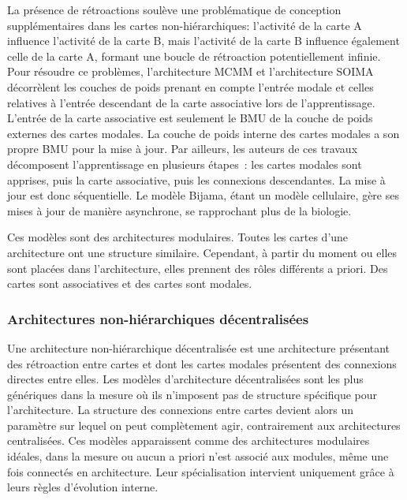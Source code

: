 \documentclass[../main]{subfiles}
\begin{document}
La présence de rétroactions soulève une problématique de conception supplémentaires dans les cartes non-hiérarchiques: l'activité de la carte A influence l'activité de la carte B, mais l'activité de la carte B influence également celle de la carte A, formant une boucle de rétroaction potentiellement infinie. 
Pour résoudre ce problèmes, l'architecture MCMM et l'architecture SOIMA décorrèlent les couches de poids prenant en compte l'entrée modale et celles relatives à l'entrée descendant de la carte associative lors de l'apprentissage.
L'entrée de la carte associative est seulement le BMU de la couche de poids externes des cartes modales. La couche de poids interne des cartes modales a son propre BMU pour la mise à jour. 
Par ailleurs, les auteurs de ces travaux décomposent l'apprentissage en plusieurs étapes~: les cartes modales sont apprises, puis la carte associative, puis les connexions descendantes. La mise à jour est donc séquentielle.
Le modèle Bijama, étant un modèle cellulaire, gère ses mises à jour de manière asynchrone, se rapprochant plus de la biologie.

Ces modèles sont des architectures modulaires. Toutes les cartes d'une architecture ont une structure similaire. Cependant, à partir du moment ou elles sont placées dans l'architecture, elles prennent des rôles différents a priori. Des cartes sont associatives et des cartes sont modales. 

\subsubsection{Architectures non-hiérarchiques décentralisées}

Une architecture non-hiérarchique décentralisée est une architecture présentant des rétroaction entre cartes et dont les cartes modales présentent des connexions directes entre elles.
Les modèles d'architecture décentralisées sont les plus génériques dans la mesure où ils n'imposent pas de structure spécifique pour l'architecture.
La structure des connexions entre cartes devient alors un paramètre sur lequel on peut complètement agir, contrairement aux architectures centralisées. 
Ces modèles apparaissent comme des architectures modulaires idéales, dans la mesure ou aucun a priori n'est associé aux modules, même une fois connectés en architecture. Leur spécialisation intervient uniquement grâce à leurs règles d'évolution interne.
\end{document}
